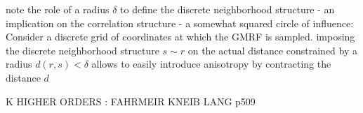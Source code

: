 \documentclass[11pt]{article}
\begin{document}
            note the role of a radius $\delta$ to define the discrete neighborhood structure - an implication on the correlation structure - a somewhat squared circle of influence: Consider a discrete grid of coordinates at which the GMRF is sampled. imposing the discrete neighborhood structure $s \sim r$ on the actual distance constrained by a radius $d(r,s)<\delta$ allows to easily introduce anisotropy by contracting the distance $d$

            K HIGHER ORDERS : FAHRMEIR KNEIB LANG p509



%
%
%
%
%
%
%
%
%
\end{document}
